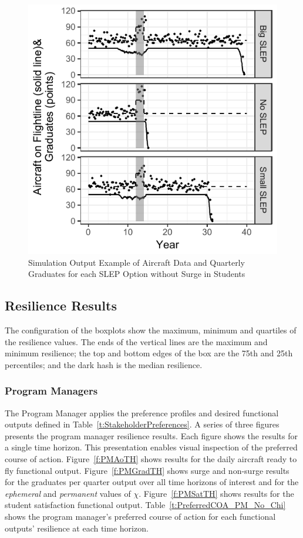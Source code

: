 \documentclass[preprint,12pt]{elsarticle}
\begin{document}
\begin{figure}[h]
  \centering\includegraphics{time_series_fleet_surge}
  \caption{Simulation Output Example of Aircraft Data and Quarterly
    Graduates for each SLEP Option without Surge in Students}
  \label{f:ts_surge}
\end{figure}



\subsection{Resilience Results}

The configuration of the boxplots show the maximum, minimum and
quartiles of the resilience values. The ends of the vertical lines are
the maximum and minimum resilience; the top and bottom edges  of the box are the
75th and 25th percentiles; and the dark hash is the median resilience.

\subsubsection{Program Managers}

The Program Manager applies the preference profiles and desired
functional outputs defined in
Table~\ref{t:StakeholderPreferences}. A series of three figures presents
the program manager resilience results. Each figure shows the results
for a single time horizon. This presentation enables visual inspection
of the preferred course of action.  Figure~\ref{f:PMAoTH} shows results for
the daily aircraft ready to fly functional
output. Figure~\ref{f:PMGradTH} shows surge and non-surge results for
the graduates per quarter output over all time horizons of interest
and for the \emph{ephemeral} and
\emph{permanent} values of $\chi$. Figure~\ref{f:PMSatTH} shows results for
the student satisfaction functional output. Table~\ref{t:PreferredCOA_PM_No_Chi} shows the program
manager's preferred course of action for each 
functional outputs' resilience at each time horizon. 
\end{document}

